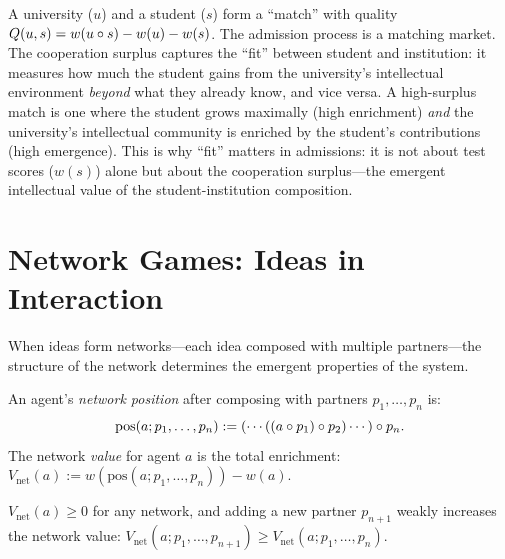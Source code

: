 \begin{example}
A university ($u$) and a student ($s$) form a ``match'' with quality
$Q(u, s) = w(u \circ s) - w(u) - w(s)$. The admission process is
a matching market. The cooperation surplus captures the ``fit'' between
student and institution: it measures how much the student gains from the
university's intellectual environment \emph{beyond} what they already
know, and vice versa. A high-surplus match is one where the student
grows maximally (high enrichment) \emph{and} the university's
intellectual community is enriched by the student's contributions (high
emergence). This is why ``fit'' matters in admissions: it is not about
test scores ($w(s)$) alone but about the cooperation surplus---the
emergent intellectual value of the student-institution composition.
\end{example}


\section{Network Games: Ideas in Interaction}

When ideas form networks---each idea composed with multiple
partners---the structure of the network determines the emergent
properties of the system.

\begin{definition}
\label{def:network-position}
An agent's \emph{network position} after composing with partners
$p_1, \ldots, p_n$ is:
\[
\text{pos}(a; p_1, \ldots, p_n) := (\cdots((a \circ p_1) \circ p_2)
\cdots) \circ p_n.
\]
The network \emph{value} for agent $a$ is the total enrichment:
$V_{\text{net}}(a) := w(\text{pos}(a; p_1, \ldots, p_n)) - w(a)$.
\end{definition}

\begin{theorem}
\label{thm:network-monotone}
$V_{\text{net}}(a) \geq 0$ for any network, and adding a new partner
$p_{n+1}$ weakly increases the network value:
$V_{\text{net}}(a; p_1, \ldots, p_{n+1}) \geq V_{\text{net}}(a; p_1, \ldots, p_n)$.
\end{theorem}

